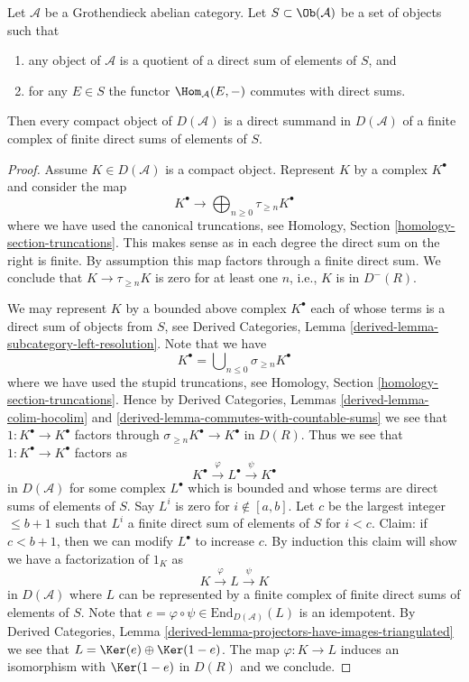 \begin{lemma}
\label{lemma-compact-in-terms-of-generators}
Let $\mathcal{A}$ be a Grothendieck abelian category. Let
$S \subset \Ob(\mathcal{A})$ be a set of objects such that
\begin{enumerate}
\item any object of $\mathcal{A}$ is a quotient of a direct sum
of elements of $S$, and
\item for any $E \in S$ the functor $\Hom_\mathcal{A}(E, -)$
commutes with direct sums.
\end{enumerate}
Then every compact object of $D(\mathcal{A})$ is a direct summand
in $D(\mathcal{A})$ of a finite complex of finite direct sums of
elements of $S$.
\end{lemma}

\begin{proof}
Assume $K \in D(\mathcal{A})$ is a compact object. Represent $K$ by a complex
$K^\bullet$ and consider the map
$$
K^\bullet
\longrightarrow
\bigoplus\nolimits_{n \geq 0} \tau_{\geq n} K^\bullet
$$
where we have used the canonical truncations, see
Homology, Section \ref{homology-section-truncations}.
This makes sense as in each degree the direct sum on the right is finite.
By assumption this map factors through a finite direct sum.
We conclude that $K \to \tau_{\geq n} K$ is zero for at least one $n$,
i.e., $K$ is in $D^{-}(R)$.

\medskip\noindent
We may represent $K$ by a bounded above complex $K^\bullet$ each of whose
terms is a direct sum of objects from $S$, see
Derived Categories, Lemma \ref{derived-lemma-subcategory-left-resolution}.
Note that we have
$$
K^\bullet = \bigcup\nolimits_{n \leq 0} \sigma_{\geq n}K^\bullet
$$
where we have used the stupid truncations, see
Homology, Section \ref{homology-section-truncations}.
Hence by Derived Categories, Lemmas \ref{derived-lemma-colim-hocolim} and
\ref{derived-lemma-commutes-with-countable-sums}
we see that $1 : K^\bullet \to K^\bullet$ factors through
$\sigma_{\geq n}K^\bullet \to K^\bullet$ in $D(R)$.
Thus we see that $1 : K^\bullet \to K^\bullet$ factors as
$$
K^\bullet \xrightarrow{\varphi} L^\bullet \xrightarrow{\psi} K^\bullet
$$
in $D(\mathcal{A})$ for some complex $L^\bullet$ which is bounded and
whose terms are direct sums of elements of $S$. Say $L^i$ is zero for
$i \not \in [a, b]$. Let $c$ be the largest integer $\leq b + 1$ such
that $L^i$ a finite direct sum of elements of $S$ for $i < c$.
Claim: if $c < b + 1$, then we can modify $L^\bullet$ to increase $c$.
By induction this claim will show we have a factorization
of $1_K$ as
$$
K \xrightarrow{\varphi} L \xrightarrow{\psi} K
$$
in $D(\mathcal{A})$ where $L$ can be represented by a finite
complex of finite direct sums of elements of $S$. Note that
$e = \varphi \circ \psi \in \text{End}_{D(\mathcal{A})}(L)$
is an idempotent. By Derived Categories,
Lemma \ref{derived-lemma-projectors-have-images-triangulated}
we see that $L = \Ker(e) \oplus \Ker(1 - e)$.
The map $\varphi : K \to L$ induces an isomorphism with
$\Ker(1 - e)$ in $D(R)$ and we conclude.


\end{proof}
